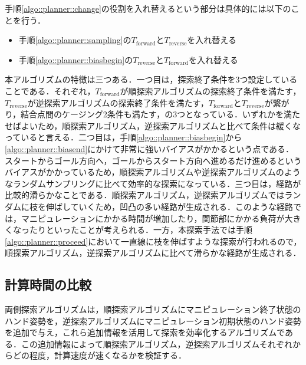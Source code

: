 \documentclass[a4paper,twoside,12pt,papersize, dvipdfmx]{iirthesis}
\begin{document}
{手順\ref{algo::planner::change}の役割を入れ替えるという部分は具体的には以下のことを行う．
\begin{itemize}
\item 手順\ref{algo::planner::sampling}の$T_{\mathrm {forward}}$と$T_{\mathrm {reverse}}$を入れ替える
\item 手順\ref{algo::planner::biasbegin}の$T_{\mathrm {reverse}}$と$T_{\mathrm {forward}}$を入れ替える
\end{itemize}


本アルゴリズムの特徴は三つある．一つ目は，探索終了条件を3つ設定していることである．それぞれ，$T_{\mathrm {forward}}$が順探索アルゴリズムの探索終了条件を満たす，$T_{\mathrm {reverse}}$が逆探索アルゴリズムの探索終了条件を満たす，$T_{\mathrm {forward}}$と$T_{\mathrm {reverse}}$が繋がり，結合点間のケージング2条件も満たす，の3つとなっている．いずれかを満たせばよいため，順探索アルゴリズム，逆探索アルゴリズムと比べて条件は緩くなっていると言える．二つ目は，手順\ref{algo::planner::biasbegin}から\ref{algo::planner::biasend}にかけて非常に強いバイアスがかかるという点である．スタートからゴール方向へ，ゴールからスタート方向へ進めるだけ進めるというバイアスがかかっているため，順探索アルゴリズムや逆探索アルゴリズムのようなランダムサンプリングに比べて効率的な探索になっている．三つ目は，経路が比較的滑らかなことである．順探索アルゴリズム，逆探索アルゴリズムではランダムに枝を伸ばしていくため，凹凸の多い経路が生成される．このような経路では，マニピュレーションにかかる時間が増加したり，関節部にかかる負荷が大きくなったりといったことが考えられる．一方，本探索手法では手順\ref{algo::planner::proceed}において一直線に枝を伸ばすような探索が行われるので，順探索アルゴリズム，逆探索アルゴリズムに比べて滑らかな経路が生成される．

\subsection{計算時間の比較}
両側探索アルゴリズムは，順探索アルゴリズムにマニピュレーション終了状態のハンド姿勢を，逆探索アルゴリズムにマニピュレーション初期状態のハンド姿勢を追加で与え，これら追加情報を活用して探索を効率化するアルゴリズムである．この追加情報によって順探索アルゴリズム，逆探索アルゴリズムそれぞれからどの程度，計算速度が速くなるかを検証する．\par
}
\end{document}

